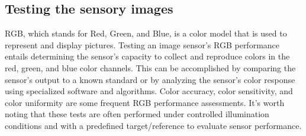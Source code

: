\documentclass[11pt, a4paper, openany]{book}
\begin{document}
\subsection{Testing the sensory images} \label{PCmini}
RGB, which stands for Red, Green, and Blue, is a color model that is used to represent and display pictures. Testing an image sensor's RGB performance entails determining the sensor's capacity to collect and reproduce colors in the red, green, and blue color channels. This can be accomplished by comparing the sensor's output to a known standard or by analyzing the sensor's color response using specialized software and algorithms. Color accuracy, color sensitivity, and color uniformity are some frequent RGB performance assessments. It's worth noting that these tests are often performed under controlled illumination conditions and with a predefined target/reference to evaluate sensor performance.
\end{document}
